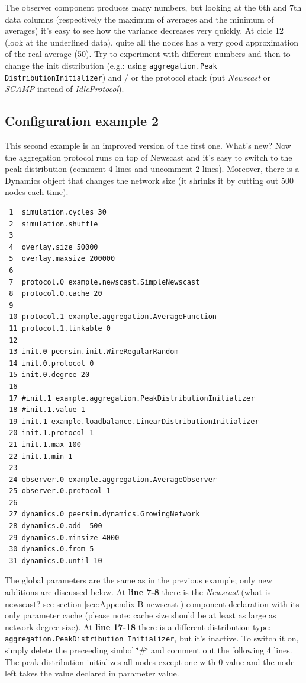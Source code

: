 \documentclass[a4paper,11pt]{article}
\begin{document}
\normalsize

The observer component produces many numbers, but looking at the 6th and
7th data columns (respectively the maximum of averages and the minimum
of averages) it's easy to see how the variance decreases very quickly.
At cicle 12 (look at the underlined data), quite all the nodes has
a very good approximation of the real average (50). Try to experiment
with different numbers and then to change the init distribution (e.g.:
using \texttt{aggregation.Peak DistributionInitializer}) and / or the
protocol stack (put \emph{Newscast} or \emph{SCAMP} instead of 
\emph{IdleProtocol}).


\subsection{Configuration example 2}

This second example is an improved version of the first one. What's
new? Now the aggregation protocol runs on top of Newscast and it's
easy to switch to the peak distribution (comment 4 lines and uncomment
2 lines). Moreover, there is a Dynamics object that changes the network
size (it shrinks it by cutting out 500 nodes each time). \\

\footnotesize
\begin{verbatim}
 1  simulation.cycles 30
 2  simulation.shuffle
 3
 4  overlay.size 50000
 5  overlay.maxsize 200000
 6
 7  protocol.0 example.newscast.SimpleNewscast
 8  protocol.0.cache 20
 9
 10 protocol.1 example.aggregation.AverageFunction
 11 protocol.1.linkable 0
 12
 13 init.0 peersim.init.WireRegularRandom
 14 init.0.protocol 0
 15 init.0.degree 20
 16 
 17 #init.1 example.aggregation.PeakDistributionInitializer
 18 #init.1.value 1
 19 init.1 example.loadbalance.LinearDistributionInitializer
 20 init.1.protocol 1
 21 init.1.max 100
 22 init.1.min 1
 23
 24 observer.0 example.aggregation.AverageObserver
 25 observer.0.protocol 1
 26
 27 dynamics.0 peersim.dynamics.GrowingNetwork
 28 dynamics.0.add -500
 29 dynamics.0.minsize 4000
 30 dynamics.0.from 5
 31 dynamics.0.until 10
\end{verbatim}
\normalsize

The global parameters are the same as in the previous example; only
new additions are discussed below. At \textbf{line 7-8} there is the
\emph{Newscast} (what is newscast? see section \ref{sec:Appendix-B-newscast}) 
component declaration with its
only parameter cache (please note: cache size should be at least as
large as network degree size). At \textbf{line 17-18} there is a different
distribution type: \texttt{aggregation.PeakDistribution Initializer},
but it's inactive. To switch it on, simply delete the preceeding simbol
\char`\"{}\#\char`\"{} and comment out the following 4 lines. The
peak distribution initializes all nodes except one with 0 value and
the node left takes the value declared in parameter value.
\end{document}
